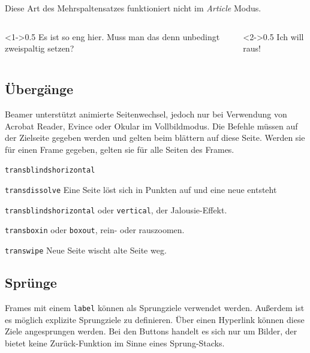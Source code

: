 Diese Art des Mehrspaltensatzes funktioniert nicht im
\textit{Article} Modus.

\begin{lfgwcode}{}
\begin{columns}[t]
  \begin{column}<1->{0.5\textwidth}
    Es ist so eng hier. Muss man das denn unbedingt zweispaltig setzen?
  \end{column}%
  \begin{column}<2->{0.5\textwidth}
    Ich will raus!
  \end{column}
\end{columns}
\end{lfgwcode}
  
\subsection{Übergänge}

Beamer unterstützt animierte Seitenwechsel, jedoch nur bei Verwendung von
Acrobat Reader, Evince oder Okular im Vollbildmodus. Die Befehle müssen auf
der Zielseite gegeben werden und gelten beim blättern auf diese Seite. Werden
sie für einen Frame gegeben, gelten sie für alle Seiten des Frames.

\begin{labeling}{\texttt{transblindshorizontal}}
  \item[\texttt{transdissolve}] Eine Seite löst sich in Punkten auf und eine neue entsteht
  \item[\texttt{transblindshorizontal}] oder \texttt{vertical}, der Jalousie-Effekt.
  \item[\texttt{transboxin}] oder \texttt{boxout}, rein- oder rauszoomen.
  \item[\texttt{transwipe}] Neue Seite wischt alte Seite weg.
\end{labeling}

\subsection{Sprünge}

Frames mit einem \texttt{label} können als Sprungziele verwendet werden.
Außerdem ist es möglich explizite Sprungziele zu definieren. Über einen
Hyperlink können diese Ziele angesprungen werden. Bei den Buttons handelt es
sich nur um Bilder, der  bietet keine
Zurück-Funktion im Sinne eines Sprung-Stacks.

\begin{lfgwcode}{}
\hypertarget{Bilder}{}
\hyperlink{Bilder}{}
\hyperlink{Bilder}{}
\hyperlink{Bilder}{}
\end{lfgwcode}

